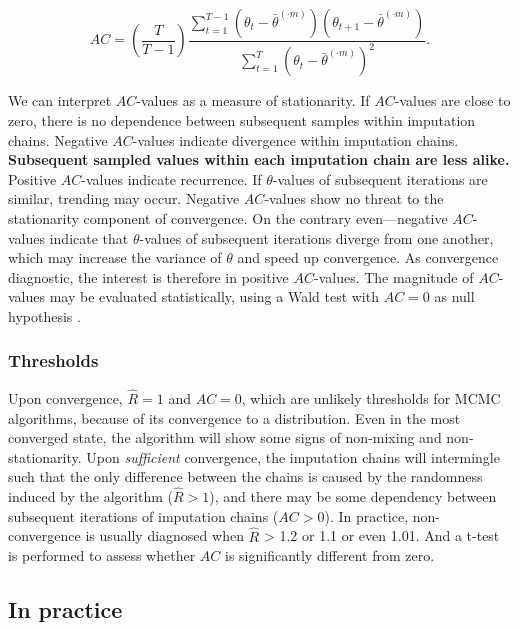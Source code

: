 \documentclass[Royal,times,sageh]{sagej}
\begin{document}
\begin{equation*}
AC = \left( \frac{T}{T-1} \right) \frac{\sum_{t=1}^{T-1}(\theta_t - \bar{\theta}^{(\cdot m)})(\theta_{t+1} - \bar{\theta}^{(\cdot m)})}{\sum_{t=1}^{T}(\theta_t - \bar{\theta}^{(\cdot m)})^2}.
\end{equation*}

We can interpret \(AC\)-values as a measure of stationarity. If \(AC\)-values are close to zero, there is no dependence between subsequent samples within imputation chains. Negative \(AC\)-values indicate divergence within imputation chains. \textbf{Subsequent sampled values within each imputation chain are less alike.} Positive \(AC\)-values indicate recurrence. If \(\theta\)-values of subsequent iterations are similar, trending may occur. Negative \(AC\)-values show no threat to the stationarity component of convergence. On the contrary even---negative \(AC\)-values indicate that \(\theta\)-values of subsequent iterations diverge from one another, which may increase the variance of \(\theta\) and speed up convergence. As convergence diagnostic, the interest is therefore in positive \(AC\)-values. The magnitude of \(AC\)-values may be evaluated statistically, using a Wald test with \(AC=0\) as null hypothesis \citep{box15}.

\hypertarget{thresholds}{%
\subsubsection{Thresholds}\label{thresholds}}

Upon convergence, \(\widehat{R}=1\) and \(AC=0\), which are unlikely thresholds for MCMC algorithms, because of its convergence to a distribution. Even in the most converged state, the algorithm will show some signs of non-mixing and non-stationarity. Upon \emph{sufficient} convergence, the imputation chains will intermingle such that the only difference between the chains is caused by the randomness induced by the algorithm (\(\widehat{R} > 1\)), and there may be some dependency between subsequent iterations of imputation chains (\(AC > 0\)). In practice, non-convergence is usually diagnosed when \(\widehat{R}\) \textgreater{} 1.2 or 1.1 or even 1.01. And a t-test is performed to assess whether \(AC\) is significantly different from zero.

\hypertarget{in-practice}{%
\subsection{In practice}\label{in-practice}}
\end{document}
